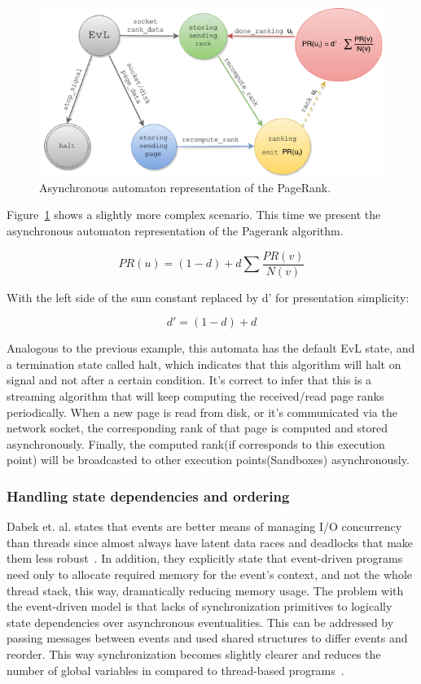 \documentclass[10pt,reprint]{socc14}
\begin{document}
\begin{figure}	
	\centering
	\includegraphics[scale=0.55]{AutomatonPageRank}
	\caption{Asynchronous automaton representation of the PageRank.}
	\label{fig:AutomatonPageRank}
\end{figure}


Figure~\ref{fig:AutomatonPageRank} shows a slightly more complex scenario. This time we present the asynchronous automaton representation of the Pagerank algorithm. 

\begin{equation}
	PR(u) =(1-d) + d\sum \frac{PR(v)}{N(v)}
\end{equation}

With the left side of the sum constant replaced by d’ for presentation simplicity:

\begin{equation}
  d' =(1-d) + d
\end{equation}

Analogous to the previous example, this automata has the default EvL state, and a termination state called halt, which indicates that this algorithm will halt on signal and not after a certain condition. It’s correct to infer that this is a streaming algorithm that will keep computing the received/read page ranks periodically. When a new page is read from disk, or it’s communicated via the network socket, the corresponding rank of that page is computed and stored asynchronously. Finally, the computed rank(if corresponds to this execution point) will be broadcasted to other execution points(Sandboxes) asynchronously.

\subsubsection{Handling state dependencies and ordering}
Dabek et. al. states that events are better means of managing I/O concurrency than threads since almost always have latent data races and deadlocks that make them less robust~\cite{Dabek2002}. In addition, they explicitly state that event-driven programs need only to allocate required memory for the event’s context, and not the whole thread stack, this way, dramatically reducing memory usage. The problem with the event-driven model is that lacks of synchronization primitives to logically state dependencies over asynchronous eventualities. This can be addressed by passing messages between events and used shared structures to differ events and reorder. This way synchronization becomes slightly clearer and reduces the number of global variables in compared to thread-based programs~\cite{Haller2009}.
\end{document}
